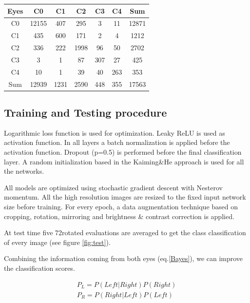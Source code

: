 \documentclass[a0,portrait]{a0poster}
\begin{document}
\begin{multicols}{3}
\begin{center}
	\begin{tabular}{c c c c c c c} 
		\hline
		Eyes & C0 & C1 & C2 & C3 & C4 & Sum\\ [0.5ex] 
		\hline\hline
		C0 & 12155 & 407 & 295 & 3 & 11 & 12871\\
		C1 & 435 & 600 & 171 & 2 & 4 & 1212\\
		C2 & 336 & 222 & 1998 & 96 & 50 & 2702\\
		C3 & 3 & 1 & 87 & 307 & 27 & 425\\
		C4 & 10 & 1 & 39 & 40 & 263 & 353\\		
		Sum & 12939 & 1231 & 2590 & 448 & 355 & 17563\\
		\hline
	\end{tabular}
	\label{table-frequencies}
\end{center}

\subsection*{Training and Testing procedure}
Logarithmic loss function is used for optimization. Leaky ReLU\cite{Dahl2013} is used as activation function. In all layers a batch normalization \cite{batch-norm} is applied before the activation function. Dropout \cite{baldi2013} (p=0.5) is performed before the final classification layer. A random initialization based in the Kaiming\&He approach\cite{kaiming} is used for all the networks. 

All models are optimized using stochastic gradient descent with Nesterov momentum. All the high resolution images are resized to the fixed input network size before training. For every epoch, a data augmentation technique based on cropping, rotation, mirroring and brightness \& contrast correction is applied.

At test time five 72\textdegree rotated evaluations are averaged to get the class classification of every image (see figure \ref{fig:test}).

Combining the information coming from both eyes (eq.\ref{Bayes}), we can improve the classification scores.

\begin{equation}
\begin{aligned}
P_L = P(Left|Right)P(Right) \\ P_R = P(Right|Left)P(Left)\\
\end{aligned}
\label{Bayes}
\end{equation}


\end{multicols}
\end{document}
